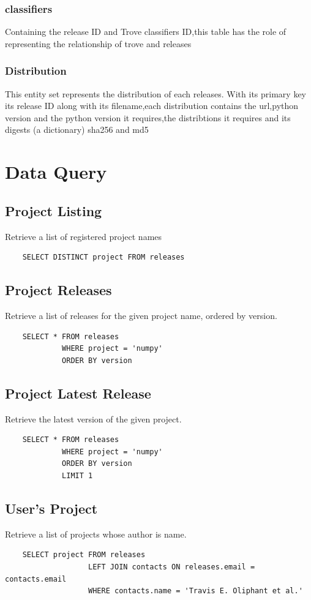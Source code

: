 \documentclass[a4paper,12pt]{article}
\begin{document}
\subsubsection{classifiers}
Containing the release ID and Trove classifiers ID,this table has the role of representing the relationship of trove and releases
\subsubsection{Distribution}
This entity set represents the distribution of each releases. With its primary key its release ID along with its filename,each distribution contains the url,python version and the python version it requires,the distribtions it requires and its digests (a dictionary) sha256 and md5


\newpage
\section{Data Query}
\subsection{Project Listing}
Retrieve a list of registered project names
\begin{verbatim}
    SELECT DISTINCT project FROM releases
\end{verbatim}
\subsection{Project Releases}
Retrieve a list of releases for the given project name, ordered by version.
\begin{verbatim}
    SELECT * FROM releases
             WHERE project = 'numpy'
             ORDER BY version
\end{verbatim}
\subsection{Project Latest Release}
Retrieve the latest version of the given project.
\begin{verbatim}
    SELECT * FROM releases
             WHERE project = 'numpy'
             ORDER BY version
             LIMIT 1
\end{verbatim}
\subsection{User's Project}
Retrieve a list of projects whose author is name.
\begin{verbatim}
    SELECT project FROM releases
                   LEFT JOIN contacts ON releases.email = contacts.email
                   WHERE contacts.name = 'Travis E. Oliphant et al.'
\end{verbatim}
\end{document}
